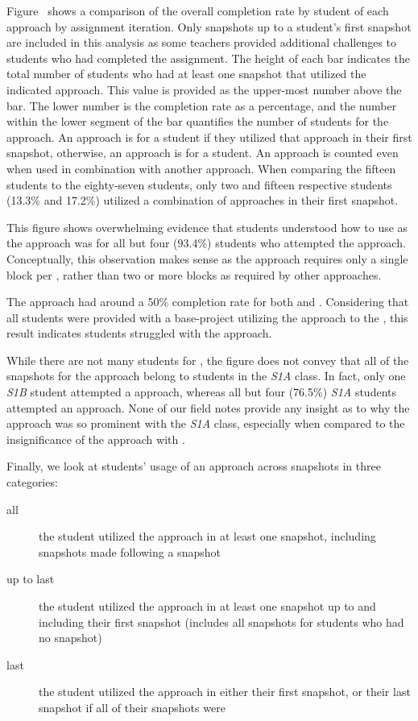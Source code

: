 Figure~ shows a comparison of the
overall completion rate by student of each approach by assignment
iteration. Only snapshots up to a student's first \com{} snapshot are included
in this analysis as some teachers provided additional challenges to students
who had completed the assignment. The height of each bar indicates the total
number of students who had at least one snapshot that utilized the indicated
approach. This value is provided as the upper-most number above the bar. The
lower number is the completion rate as a percentage, and the number within the
lower segment of the bar quantifies the number of \com{} students for the
approach. An approach is \com{} for a student if they utilized that approach in
their first \com{} snapshot, otherwise, an approach is \incom{} for a
student. An approach is counted even when used in combination with another
approach. When comparing the fifteen \sone{} \com{} students to the
eighty-seven \stwo{} \com{} students, only two and fifteen respective \com{}
students (13.3\% and 17.2\%) utilized a combination of approaches in their
first \com{} snapshot.

This figure shows overwhelming evidence that students understood how to use
\glideto{} as the approach was \com{} for all but four (93.4\%) students who
attempted the approach. Conceptually, this observation makes sense as the
approach requires only a single block per \catch{}, rather than two or more
blocks as required by other approaches.

The \abs{} approach had around a 50\% completion rate for both \sone{} and
\stwo{}. Considering that all students were provided with a base-project
utilizing the \abs{} approach to \catch{} the \zebra{}, this result indicates
students struggled with the \abs{} approach.

While there are not many students for \sone{}, the figure does not convey that
all of the \com{} snapshots for the \rel{} approach belong to students in the
\emph{S1A} class. In fact, only one \emph{S1B} student attempted a \rel{}
approach, whereas all but four (76.5\%) \emph{S1A} students attempted an \abs{}
approach. None of our field notes provide any insight as to why the \rel{}
approach was so prominent with the \emph{S1A} class, especially when compared
to the insignificance of the \rel{} approach with \stwo{}.

Finally, we look at students' usage of an approach across snapshots in three
categories:

\begin{description}
\item[all] the student utilized the approach in at least one snapshot,
  including snapshots made following a \com{} snapshot
\item[up to last] the student utilized the approach in at least one snapshot up
  to and including their first \com{} snapshot (includes all snapshots for
  students who had no \com{} snapshot)
\item[last] the student utilized the approach in either their first \com{}
  snapshot, or their last snapshot if all of their snapshots were \incom{}
\end{description}

